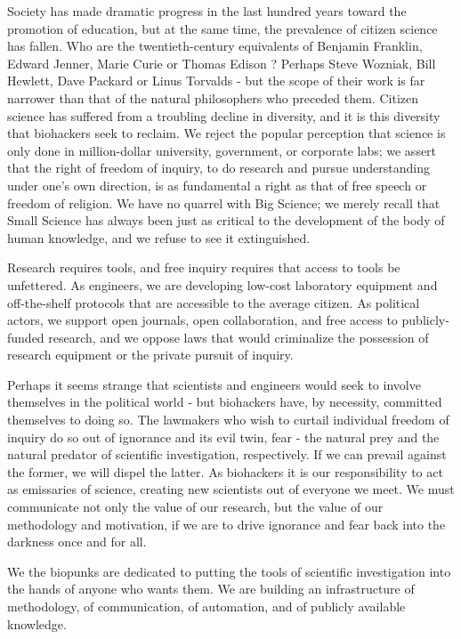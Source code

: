\documentclass[letterpaper,12pt,english]{sphinxmanual}
\begin{document}
Society has made dramatic progress in the last hundred years toward the promotion of education, but at the same time, the prevalence of citizen science has fallen. Who are the twentieth-century equivalents of Benjamin Franklin, Edward Jenner, Marie Curie or Thomas Edison ? Perhaps Steve Wozniak, Bill Hewlett, Dave Packard or Linus Torvalds - but the scope of their work is far narrower than that of the natural philosophers who preceded them. Citizen science has suffered from a troubling decline in diversity, and it is this diversity that biohackers seek to reclaim. We reject the popular perception that science is only done in million-dollar university, government, or corporate labs; we assert that the right of freedom of inquiry, to do research and pursue understanding under one's own direction, is as fundamental a right as that of free speech or freedom of religion. We have no quarrel with Big Science; we merely recall that Small Science has always been just as critical to the development of the body of human knowledge, and we refuse to see it extinguished.

Research requires tools, and free inquiry requires that access to tools be unfettered. As engineers, we are developing low-cost laboratory equipment and off-the-shelf protocols that are accessible to the average citizen. As political actors, we support open journals, open collaboration, and free access to publicly-funded research, and we oppose laws that would criminalize the possession of research equipment or the private pursuit of inquiry.

Perhaps it seems strange that scientists and engineers would seek to involve themselves in the political world - but biohackers have, by necessity, committed themselves to doing so. The lawmakers who wish to curtail individual freedom of inquiry do so out of ignorance and its evil twin, fear - the natural prey and the natural predator of scientific investigation, respectively. If we can prevail against the former, we will dispel the latter. As biohackers it is our responsibility to act as emissaries of science, creating new scientists out of everyone we meet. We must communicate not only the value of our research, but the value of our methodology and motivation, if we are to drive ignorance and fear back into the darkness once and for all.

We the biopunks are dedicated to putting the tools of scientific investigation into the hands of anyone who wants them. We are building an infrastructure of methodology, of communication, of automation, and of publicly available knowledge.
\end{document}
